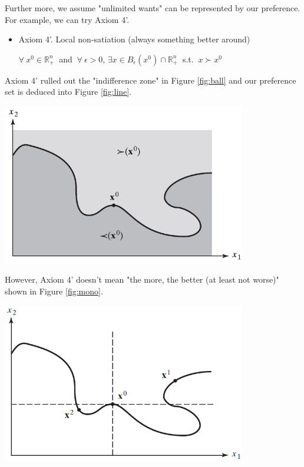 \documentclass{article}
\newcommand{\R}{\mathbb{R}}
\begin{document}
\begin{mdframed}[backgroundcolor=blue!20,linecolor=white]
Further more, we assume "unlimited wants" can be represented by our preference.
For example, we can try Axiom 4'.

\begin{itemize}
\item Axiom 4'. Local non-satiation (always something better around)

$\forall \ x^0 \in \R^n_+ \ $ and $ \ \forall \ \epsilon > 0$, $\exists x 
\in B_{\epsilon}(x^0) \cap \R^n_+ \ $ s.t. $\ x \succ x^0$
\end{itemize}


Axiom 4' rulled out the "indifference zone" in Figure \ref{fig:ball} and our preference set
is deduced into Figure \ref{fig:line}.
\vspace{2mm}

{\centering
\includegraphics[width=0.8\textwidth]{1.line}
\label{fig:line}}
\vspace{2mm}

However, Axiom 4' doesn't mean "the more, the better (at least not worse)" shown in Figure \ref{fig:mono}.
\vspace{2mm}

{\centering
\includegraphics[width=0.8\textwidth]{1.mono}
\label{fig:mono}}
\vspace{2mm}


\end{mdframed}
\end{document}
